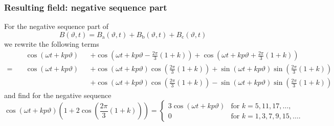 \begin{frame}
	\frametitle{Resulting field: negative sequence part}
    For the negative sequence part of
    \begin{equation*}
        B(\vartheta, t) = B_\mathrm{a}(\vartheta, t) + B_\mathrm{b}(\vartheta, t) + B_\mathrm{c}(\vartheta, t)
    \end{equation*}
    we rewrite the following terms
    \begin{equation*}
        \begin{alignedat}{2}
        &\cos(\omega t + k p \vartheta) &&+ \cos(\omega t + k p \vartheta - \frac{2\pi}{3}(1+k)) + \cos(\omega t + k p \vartheta + \frac{2\pi}{3}(1+k))\\
         = \quad &\cos(\omega t + k p \vartheta) &&+ \cos(\omega t + k p \vartheta) \cos(\frac{2\pi}{3}(1+k)) + \sin(\omega t + k p \vartheta) \sin(\frac{2\pi}{3}(1+k))\\
         & &&+ \cos(\omega t + k p \vartheta) \cos(\frac{2\pi}{3}(1+k)) - \sin(\omega t + k p \vartheta)\sin(\frac{2\pi}{3}(1+k))
        \end{alignedat}
    \end{equation*}
    and find for the negative sequence
    \begin{equation}
        \cos(\omega t + k p \vartheta)(1+2\cos(\frac{2\pi}{3}(1+k))) = \begin{cases}
            3 \cos(\omega t + k p \vartheta) & \text{for } k=5,11,17,\ldots, \\
            0 & \text{for } k=1, 3, 7,9,15, \ldots.
        \end{cases}
    \end{equation}
\end{frame}

